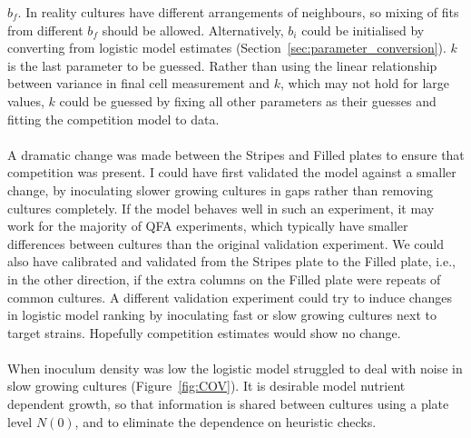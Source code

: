 \(b_{f}\). In reality cultures have different arrangements of
neighbours, so mixing of fits from different \(b_{f}\) should be
allowed. Alternatively, \(b_{i}\) could be initialised by converting
from logistic model estimates
(Section~\ref{sec:parameter_conversion}). \(k\) is the last parameter
to be guessed. Rather than using the linear relationship between
variance in final cell measurement and \(k\), which may not hold for
large values, \(k\) could be guessed by fixing all other parameters as
their guesses and fitting the competition model to data.
\\\\
A dramatic change was made between the Stripes and Filled plates to
ensure that competition was present. I could have first validated the
model against a smaller change, by inoculating slower growing cultures
in gaps rather than removing cultures completely. If the model behaves
well in such an experiment, it may work for the majority of QFA
experiments, which typically have smaller differences between cultures
than the original validation experiment. We could also have calibrated
and validated from the Stripes plate to the Filled plate, i.e., in the
other direction, if the extra columns on the Filled plate were repeats
of common cultures. A different validation experiment could try to
induce changes in logistic model ranking by inoculating fast or slow
growing cultures next to target strains. Hopefully competition
estimates would show no change.
\\\\
When inoculum density was low the logistic model struggled to deal
with noise in slow growing cultures (Figure~\ref{fig:COV}). It is
desirable model nutrient dependent growth, so that information is
shared between cultures using a plate level \(N(0)\), and to eliminate
the dependence on heuristic checks.



